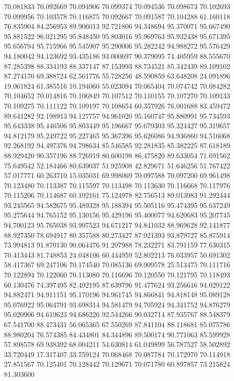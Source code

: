 70.081833
70.092669
70.094906
70.099374
70.094536
70.098673
70.102693
70.099956
70.103578
70.116875
70.092667
70.091587
70.104288
61.160118
76.835904
84.256953
89.906013
92.721806
94.348694
95.370071
95.667490
95.881522
96.021295
95.848450
95.803016
95.969763
95.932438
95.671395
95.656794
95.715966
95.545907
95.290006
95.282242
94.988272
95.576429
94.180042
94.123692
93.435186
93.000697
90.379095
74.405959
88.555670
87.285398
88.334193
88.337147
87.153993
88.734521
85.342439
89.109102
87.274170
69.388724
62.561776
55.728256
48.590859
63.648208
24.091896
19.061824
61.385516
10.194060
55.023094
70.065404
70.074742
70.084282
70.104652
70.014816
70.106849
70.107512
70.110155
70.107270
70.109133
70.109275
70.111122
70.109197
70.108654
60.357926
76.001688
83.459472
89.641282
92.198913
94.127757
94.961020
95.160747
95.880991
95.734593
95.643338
95.446506
95.803449
95.196667
95.679303
95.324427
95.319657
94.812179
95.249722
95.227465
95.367396
95.626086
94.936860
94.516068
92.268192
94.497376
94.798634
85.546585
92.281835
85.382225
87.618189
88.929420
90.357196
88.726919
80.600198
86.475820
89.633054
71.691562
75.649542
52.184466
80.639037
51.925908
42.829671
51.646256
51.767422
57.017771
60.263710
15.035031
69.998069
70.097588
70.097200
69.961498
70.123480
70.113387
70.115597
70.113498
70.113630
70.116668
70.117976
70.115206
70.114687
60.192161
75.124978
82.756513
89.013983
91.292444
93.245565
94.582675
95.489328
95.188394
95.505116
95.474395
95.637249
95.275644
94.765152
95.130156
95.429196
95.400077
94.620683
95.207745
94.700123
95.765038
93.997523
94.671217
94.841032
88.969628
92.141877
88.927350
78.694917
80.357588
80.273427
87.021393
93.879727
85.875914
73.994813
91.870130
90.064476
91.207988
78.232271
83.791159
77.630315
70.413443
81.748853
24.048106
60.444959
52.802213
76.033957
50.691302
58.417367
69.247106
70.174540
70.085136
69.909578
25.513475
70.111716
70.122894
70.122060
70.113080
70.116696
70.120550
70.121795
70.118493
60.130476
74.397495
82.492195
87.639796
91.477624
93.256616
94.029122
94.882471
94.911151
95.170196
94.961745
94.866841
94.818148
95.089128
95.076922
95.064791
93.698314
94.581479
94.705924
94.341752
94.876279
95.020906
94.619623
94.686226
92.544266
90.032714
87.935767
88.548379
67.541700
88.473431
56.065365
67.550269
87.841104
88.118681
85.075786
88.980204
76.574385
84.434801
84.344896
89.500174
90.771063
85.599928
57.898578
69.938392
68.004211
54.630814
61.049899
56.787527
58.502892
33.720449
17.317407
33.759124
70.068468
70.087784
70.172970
70.114918
27.851567
70.125401
70.128442
70.129671
70.071780
60.897857
73.215824
81.303600
